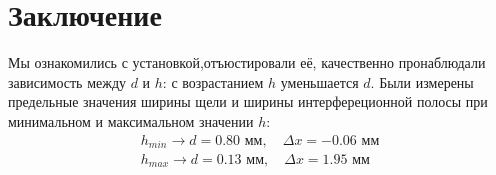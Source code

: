 \section{Заключение}
Мы ознакомились с установкой,отъюстировали её, качественно пронаблюдали зависимость между $d$ и $h$: с возрастанием $h$ уменьшается $d$. Были измерены предельные значения ширины щели и ширины интерфереционной полосы при минимальном и максимальном значении $h$: 
\begin{gather*}
h_{min}\to d=0.80\text{ мм}, \quad \Delta x=-0.06\text{ мм}\\
h_{max}\to d=0.13\text{ мм}, \quad \Delta x=1.95\text{ мм} 	
\end{gather*}
   
 